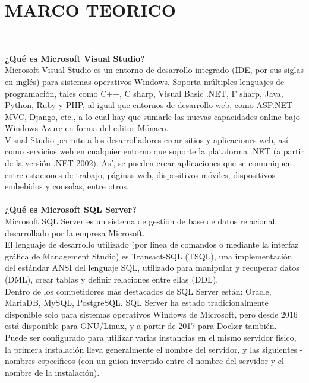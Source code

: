 \section{MARCO TEORICO} 
\textbf{}\\
\begin{flushleft}
\textbf {¿Qué es Microsoft Visual Studio?}\\
Microsoft Visual Studio es un entorno de desarrollo integrado (IDE, por sus siglas en inglés) para sistemas operativos Windows. Soporta múltiples lenguajes de programación, tales como C++, C sharp, Visual Basic .NET, F sharp, Java, Python, Ruby y PHP, al igual que entornos de desarrollo web, como ASP.NET MVC, Django, etc., a lo cual hay que sumarle las nuevas capacidades online bajo Windows Azure en forma del editor Mónaco.\textbf{}\\
Visual Studio permite a los desarrolladores crear sitios y aplicaciones web, así como servicios web en cualquier entorno que soporte la plataforma .NET (a partir de la versión .NET 2002). Así, se pueden crear aplicaciones que se comuniquen entre estaciones de trabajo, páginas web, dispositivos móviles, dispositivos embebidos y consolas, entre otros.
\textbf{}\\
\textbf{}\\
\textbf {¿Qué es Microsoft SQL Server?}\\
Microsoft SQL Server es un sistema de gestión de base de datos relacional, desarrollado por la empresa Microsoft.\textbf{}\\
El lenguaje de desarrollo utilizado (por línea de comandos o mediante la interfaz gráfica de Management Studio) es Transact-SQL (TSQL), una implementación del estándar ANSI del lenguaje SQL, utilizado para manipular y recuperar datos (DML), crear tablas y definir relaciones entre ellas (DDL).\textbf{}\\
Dentro de los competidores más destacados de SQL Server están: Oracle, MariaDB, MySQL, PostgreSQL. SQL Server ha estado tradicionalmente disponible solo para sistemas operativos Windows de Microsoft, pero desde 2016 está disponible para GNU/Linux, y a partir de 2017 para Docker también.\textbf{}\\
Puede ser configurado para utilizar varias instancias en el mismo servidor físico, la primera instalación lleva generalmente el nombre del servidor, y las siguientes - nombres específicos (con un guion invertido entre el nombre del servidor y el nombre de la instalación).


\end{flushleft}
